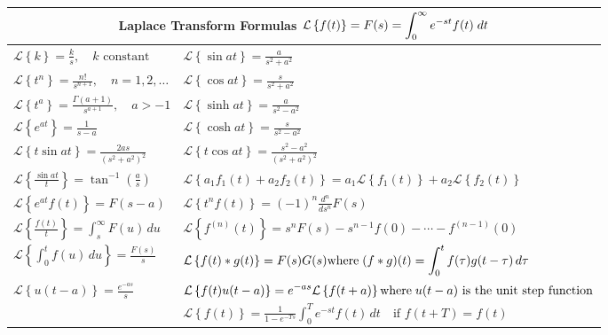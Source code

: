 \documentclass{article}
\newcommand{\laplace}[1]{\mathcal{L}\left\{#1\right\}}
\begin{document}
\pagebreak
    \begin{center}
    \renewcommand{\arraystretch}{3.5}
        \begin{tabular}{|p{}|p{}|}
            \hline
            \multicolumn{2}{|c|}{\textbf{Laplace Transform Formulas} $\displaystyle\newline{\laplace{f(t)} = F(s) = \int_0^\infty e^{-st} f(t) \; dt}$} \\
            \hline
            $\displaystyle\laplace{k} = \frac{k}{s},\quad k \text{ constant}$ & $\displaystyle\laplace{\sin at} = \frac{a}{s^2 + a^2} $ \\
            $\displaystyle\laplace{t^n} = \frac{n!}{s^{n+1}},\quad n=1,2,\dots$ & $\displaystyle\laplace{\cos at} = \frac{s}{s^2 + a^2} $ \\
            $\displaystyle\laplace{t^a} = \frac{\Gamma(a+1)}{s^{a+1}},\quad a > -1 $ & $\displaystyle\laplace{\sinh at} = \frac{a}{s^2 - a^2} $ \\
            $\displaystyle\laplace{e^{at}} = \frac{1}{s - a} $ & $\displaystyle\laplace{\cosh at} = \frac{s}{s^2 - a^2} $ \\
            $\displaystyle\laplace{t \sin at} = \frac{2as}{(s^2 + a^2)^2} $ & $\displaystyle\laplace{t \cos at} = \frac{s^2 - a^2}{(s^2 + a^2)^2} $ \\
            $\displaystyle\laplace{\frac{\sin at}{t}} = \tan^{-1}\left(\frac{a}{s}\right)$ & $\displaystyle\laplace{a_1 f_1(t) + a_2 f_2(t)} = a_1 \laplace{f_1(t)} + a_2 \laplace{f_2(t)}$ \\
            $\displaystyle\laplace{e^{at} f(t)} = F(s - a)$ & $\displaystyle\laplace{t^n f(t)} = (-1)^n \frac{d^n}{ds^n}F(s)$ \\
            $\displaystyle\laplace{\frac{f(t)}{t}} = \int_s^\infty F(u)\,du$ & $\displaystyle\laplace{f^{(n)}(t)} = s^nF(s) - s^{n-1}f(0) - \cdots - f^{(n-1)}(0)$ \\
            $\displaystyle\laplace{\int_0^t f(u)\,du} = \frac{F(s)}{s}$ & $\displaystyle\laplace{f(t) * g(t)} = F(s)G(s) \newline{\text{where} \; (f * g)(t) = \int_0^t f(\tau) g(t - \tau)\,d\tau}$ \\
            $\displaystyle\laplace{u(t - a)} = \frac{e^{-as}}{s}$ & $\displaystyle\laplace{f(t)u(t - a)} = e^{-as} \laplace{f(t + a)} \newline{\text{where} \; u(t - a) \text{ is the unit step function}}$ \\
            & $\displaystyle\laplace{f(t)} = \frac{1}{1 - e^{-Ts}} \int_0^T e^{-st} f(t)\,dt \quad \text{if } f(t + T) = f(t)$ \\         
            \hline
        \end{tabular}
    \end{center}
\end{document}
